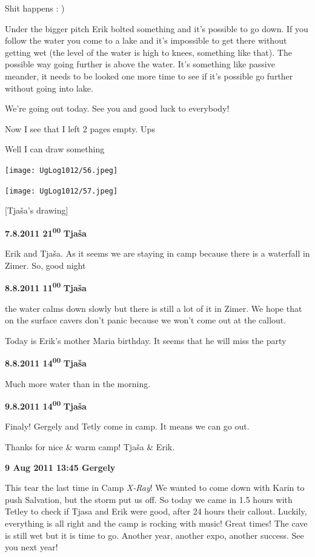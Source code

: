 Shit happens : )

Under the bigger pitch Erik bolted something and it's possible to go
down. If you follow the water you come to a lake and it's impossible to
get there without getting wet (the level of the water is high to knees,
something like that). The possible way going further is above the water.
It's something like passive meander, it needs to be looked one more time
to see if it's possible go further without going into lake.

We're going out today. See you and good luck to everybody!

Now I see that I left 2 pages empty. Ups

Well I can draw something

\texttt{[image: UgLog1012/56.jpeg]}

\texttt{[image: UgLog1012/57.jpeg]}

{[}Tjaša's drawing{]}

\textbf{7.8.2011 21\textsuperscript{00}} \textbf{Tjaša}

Erik and Tjaša. As it seems we are staying in camp because there is a
waterfall in Zimer. So, good night

\textbf{8.8.2011 11\textsuperscript{00}} \textbf{Tjaša}

the water calms down slowly but there is still a lot of it in Zimer. We
hope that on the surface cavers don't panic because we won't come out at
the callout.

Today is Erik's mother Maria birthday. It seems that he will miss the
party

\textbf{8.8.2011 14\textsuperscript{00}} \textbf{Tjaša}

Much more water than in the morning.

\textbf{9.8.2011 14\textsuperscript{00}} \textbf{Tjaša}

Finaly! Gergely and Tetly come in camp. It means we can go out.

Thanks for nice \& warm camp! Tjaša \& Erik.

\textbf{9 Aug 2011 13:45 Gergely}

This tear the last time in Camp \emph{X-Ray}! We wanted to come down
with Karin to push Salvation, but the storm put us off. So today we came
in 1.5 hours with Tetley to check if Tjasa and Erik were good, after 24
hours their callout. Luckily, everything is all right and the camp is
rocking with music! Great times! The cave is still wet but it is time to
go. Another year, another expo, another success. See you next year!

